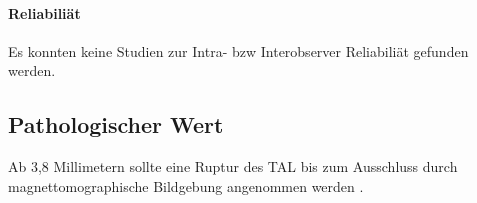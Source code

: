 \documentclass{report}
\begin{document}
\paragraph{Reliabiliät}
Es konnten keine Studien zur Intra- bzw Interobserver Reliabiliät gefunden werden.


\subsection{Pathologischer Wert}
Ab 3,8 Millimetern sollte eine Ruptur des TAL bis zum Ausschluss durch magnettomographische Bildgebung angenommen werden \cite{Woods2017,Radcliff2013}.





\end{document}
